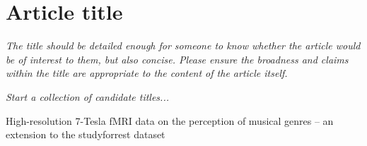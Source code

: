 \section*{Article title}
\textit{The title should be detailed enough for someone to know whether the article would be of interest to them, but also concise. Please ensure the broadness and claims within the title are appropriate to the content of the article itself.}

\textit{Start a collection of candidate titles...}

High-resolution 7-Tesla fMRI data on the perception of musical genres -- an extension to the studyforrest dataset